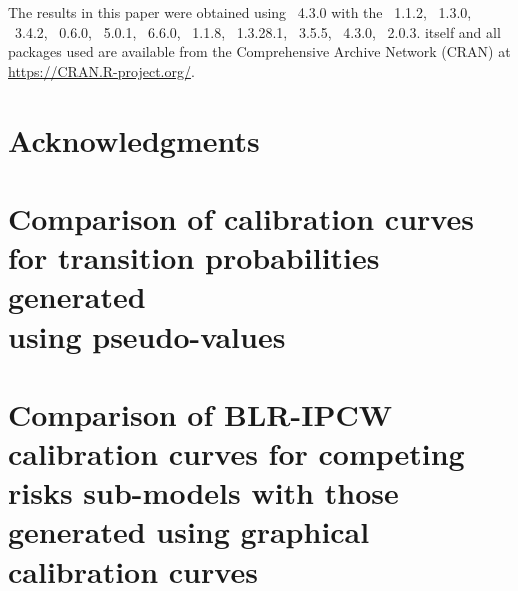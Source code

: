\documentclass[nojss]{jss}
\begin{document}
The results in this paper were obtained using
~4.3.0 with the
~1.1.2,
~1.3.0,
~3.4.2,
~0.6.0,
~5.0.1,
~6.6.0,
~1.1.8,
~1.3.28.1,
~3.5.5,
~4.3.0,
~2.0.3.  itself
and all packages used are available from the Comprehensive
 Archive Network (CRAN) at
\url{https://CRAN.R-project.org/}.

\section*{Acknowledgments}




\newpage

\begin{appendix}

\section[Comparison of calibration curves for transition probabilities generated using pseudo-values]{\texorpdfstring{Comparison of calibration curves for transition probabilities generated\\ using pseudo-values}{Comparison of calibration curves for transition probabilities generated using pseudo-values}} \label{app:pseudo}

\section[Comparison of BLR-IPCW calibration curves for competing risks sub-models with those generated using graphical calibration curves]{\texorpdfstring{Comparison of BLR-IPCW calibration curves for competing risks sub-models with those generated using graphical calibration curves}{Comparison of BLR-IPCW calibration curves for competing risks\\ sub-models with those generated using graphical calibration curves}} \label{app:gcc}

\end{appendix}
\end{document}
